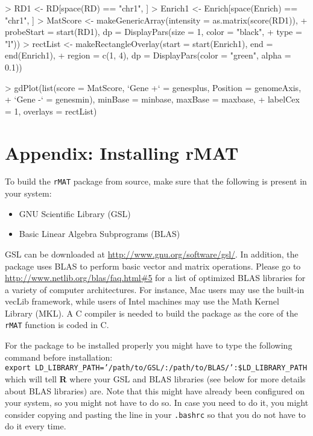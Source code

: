 \documentclass[11pt]{article}
\begin{document}
\begin{Schunk}
\begin{Sinput}
> RD1 <- RD[space(RD) == "chr1", ]
> Enrich1 <- Enrich[space(Enrich) == "chr1", ]
> MatScore <- makeGenericArray(intensity = as.matrix(score(RD1)), 
+     probeStart = start(RD1), dp = DisplayPars(size = 1, color = "black", 
+         type = "l"))
> rectList <- makeRectangleOverlay(start = start(Enrich1), end = end(Enrich1), 
+     region = c(1, 4), dp = DisplayPars(color = "green", alpha = 0.1))
\end{Sinput}
\end{Schunk}

\begin{Schunk}
\begin{Sinput}
> gdPlot(list(score = MatScore, `Gene +` = genesplus, Position = genomeAxis, 
+     `Gene -` = genesmin), minBase = minbase, maxBase = maxbase, 
+     labelCex = 1, overlays = rectList)
\end{Sinput}
\end{Schunk}


\part{Appendix: Installing rMAT}

To build the \texttt{rMAT} package from source, make sure that the following is present in your system:
\begin{itemize}
\item GNU Scientific Library (GSL)
\item Basic Linear Algebra Subprograms (BLAS)
\end{itemize}

GSL can be downloaded at \url{http://www.gnu.org/software/gsl/}.  In addition, the package uses BLAS to perform basic vector and matrix operations.  Please go to \url{http://www.netlib.org/blas/faq.html#5} for a list of optimized BLAS libraries for a variety of computer architectures.  For instance, Mac users may use the built-in vecLib framework, while users of Intel machines may use the Math Kernel Library (MKL).  A C compiler is needed to build the package as the core of the \texttt{rMAT} function is coded in C.

For the package to be installed properly you might have to type the following command before installation:\\[6pt]
\texttt{export LD\_LIBRARY\_PATH='/path/to/GSL/:/path/to/BLAS/':\$LD\_LIBRARY\_PATH}\\[6pt]
which will tell {\bf R} where your GSL and BLAS libraries (see below for more details about BLAS libraries) are.  Note that this might have already been configured on your system, so you might not have to do so.  In case you need to do it, you might consider copying and pasting the line in your \texttt{.bashrc} so that you do not have to do it every time. 
\end{document}
